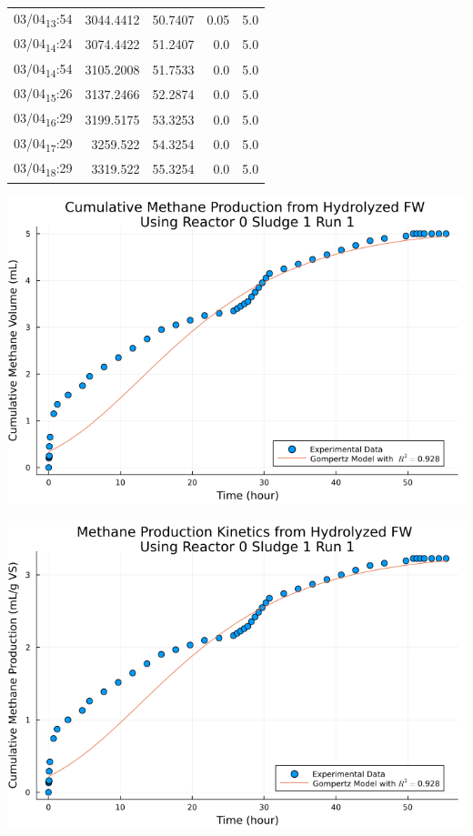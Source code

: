 \documentclass[11pt]{article}
\begin{document}
\begin{center}
\begin{tabular}{lrrrr}
03/04\textsubscript{13}:54 & 3044.4412 & 50.7407 & 0.05 & 5.0\\[0pt]
03/04\textsubscript{14}:24 & 3074.4422 & 51.2407 & 0.0 & 5.0\\[0pt]
03/04\textsubscript{14}:54 & 3105.2008 & 51.7533 & 0.0 & 5.0\\[0pt]
03/04\textsubscript{15}:26 & 3137.2466 & 52.2874 & 0.0 & 5.0\\[0pt]
03/04\textsubscript{16}:29 & 3199.5175 & 53.3253 & 0.0 & 5.0\\[0pt]
03/04\textsubscript{17}:29 & 3259.522 & 54.3254 & 0.0 & 5.0\\[0pt]
03/04\textsubscript{18}:29 & 3319.522 & 55.3254 & 0.0 & 5.0\\[0pt]
\end{tabular}
\end{center}

\begin{center}
\includegraphics[width=.9\linewidth]{../plots/BMPs/Hydrolyzed FW/methane_kinetics_hydrolysate_0_s1_r1_hour.png}
\end{center}

\begin{center}
\includegraphics[width=.9\linewidth]{../plots/BMPs/Hydrolyzed FW/specific_methane_kinetics_hydrolysate_0_s1_r1_hour.png}
\end{center}
\end{document}
